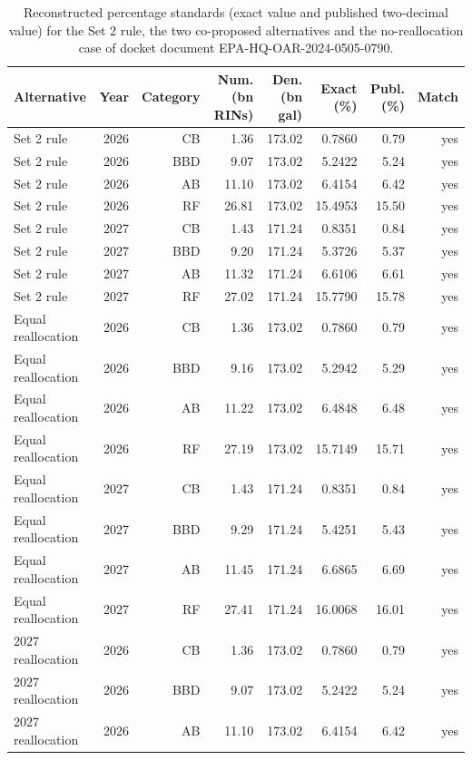 \begin{table}[htbp]
\centering
\caption{Reconstructed percentage standards (exact value and published two-decimal value) for the Set 2 rule, the two co-proposed alternatives and the no-reallocation case of docket document EPA-HQ-OAR-2024-0505-0790.}
\label{tab:reconstruction}
\footnotesize\setlength{\tabcolsep}{4pt}
\begin{tabular}{lrrrrrrr}
\toprule
Alternative & Year & Category & Num. (bn RINs) & Den. (bn gal) & Exact (\%) & Publ. (\%) & Match \\
\midrule
Set 2 rule & 2026 & CB & 1.36 & 173.02 & 0.7860 & 0.79 & yes \\
Set 2 rule & 2026 & BBD & 9.07 & 173.02 & 5.2422 & 5.24 & yes \\
Set 2 rule & 2026 & AB & 11.10 & 173.02 & 6.4154 & 6.42 & yes \\
Set 2 rule & 2026 & RF & 26.81 & 173.02 & 15.4953 & 15.50 & yes \\
Set 2 rule & 2027 & CB & 1.43 & 171.24 & 0.8351 & 0.84 & yes \\
Set 2 rule & 2027 & BBD & 9.20 & 171.24 & 5.3726 & 5.37 & yes \\
Set 2 rule & 2027 & AB & 11.32 & 171.24 & 6.6106 & 6.61 & yes \\
Set 2 rule & 2027 & RF & 27.02 & 171.24 & 15.7790 & 15.78 & yes \\
Equal reallocation & 2026 & CB & 1.36 & 173.02 & 0.7860 & 0.79 & yes \\
Equal reallocation & 2026 & BBD & 9.16 & 173.02 & 5.2942 & 5.29 & yes \\
Equal reallocation & 2026 & AB & 11.22 & 173.02 & 6.4848 & 6.48 & yes \\
Equal reallocation & 2026 & RF & 27.19 & 173.02 & 15.7149 & 15.71 & yes \\
Equal reallocation & 2027 & CB & 1.43 & 171.24 & 0.8351 & 0.84 & yes \\
Equal reallocation & 2027 & BBD & 9.29 & 171.24 & 5.4251 & 5.43 & yes \\
Equal reallocation & 2027 & AB & 11.45 & 171.24 & 6.6865 & 6.69 & yes \\
Equal reallocation & 2027 & RF & 27.41 & 171.24 & 16.0068 & 16.01 & yes \\
2027 reallocation & 2026 & CB & 1.36 & 173.02 & 0.7860 & 0.79 & yes \\
2027 reallocation & 2026 & BBD & 9.07 & 173.02 & 5.2422 & 5.24 & yes \\
2027 reallocation & 2026 & AB & 11.10 & 173.02 & 6.4154 & 6.42 & yes \\

\end{tabular}
\end{table}
